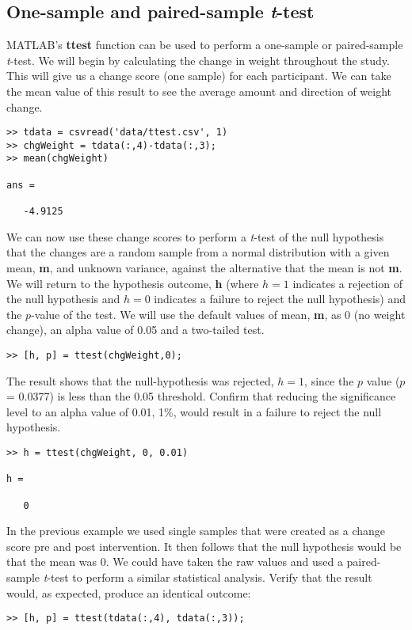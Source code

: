 \documentclass[12pt,a4paper]{article}
\begin{document}
\subsection{One-sample and paired-sample \emph{t}-test}
MATLAB's \textbf{ttest} function can be used to perform a one-sample or paired-sample \emph{t}-test.  
We will begin by calculating the change in weight throughout the study.  
This will give us a change score (one sample) for each participant.  
We can take the mean value of this result to see the average amount and direction of weight change.
\begin{lstlisting}[style=Matlab-editor]
>> tdata = csvread('data/ttest.csv', 1)
>> chgWeight = tdata(:,4)-tdata(:,3);
>> mean(chgWeight)

ans =

   -4.9125
\end{lstlisting}
We can now use these change scores to perform a \emph{t}-test of the null hypothesis that the changes are a random sample from a normal distribution with a given mean, \textbf{m}, and unknown variance, against the alternative that the mean is not \textbf{m}.  
We will return to the hypothesis outcome, \textbf{h} (where $h = 1$ indicates a rejection of the null hypothesis and $h = 0$ indicates a failure to reject the null hypothesis) and the $p$-value of the test.  
We will use the default values of mean, \textbf{m}, as 0 (no weight change), an alpha value of 0.05 and a two-tailed test.
\begin{lstlisting}[style=Matlab-editor]
>> [h, p] = ttest(chgWeight,0);
\end{lstlisting}
The result shows that the null-hypothesis was rejected, $h = 1$, since the $p$ value ($p$ = 0.0377) is less than the 0.05 threshold.  
Confirm that reducing the significance level to an alpha value of 0.01, 1\%, would result in a failure to reject the null hypothesis.
\begin{lstlisting}[style=Matlab-editor]
>> h = ttest(chgWeight, 0, 0.01)

h = 

   0
\end{lstlisting}
In the previous example we used single samples that were created as a change score pre and post intervention.  
It then follows that the null hypothesis would be that the mean was 0.  
We could have taken the raw values and used a paired-sample \emph{t}-test to perform a similar statistical analysis.  
Verify that the result would, as expected, produce an identical outcome:
\begin{lstlisting}[style=Matlab-editor]
>> [h, p] = ttest(tdata(:,4), tdata(:,3));
\end{lstlisting}
\end{document}
